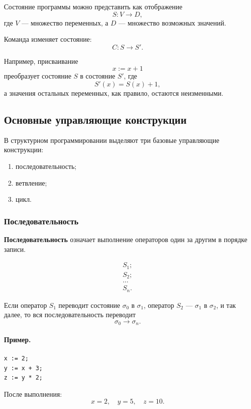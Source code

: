 \documentclass[12pt,a4paper]{article}
\begin{document}
Состояние программы можно представить как отображение
\[
    S : V \to D,
\]
где $V$ --- множество переменных, а $D$ --- множество возможных значений.

Команда изменяет состояние:
\[
    C : S \to S'.
\]

Например, присваивание
\[
    x := x + 1
\]
преобразует состояние $S$ в состояние $S'$, где
\[
    S'(x) = S(x) + 1,
\]
а значения остальных переменных, как правило, остаются неизменными.

\subsection{Основные управляющие конструкции}

В структурном программировании выделяют три базовые управляющие конструкции:
\begin{enumerate}
    \item последовательность;
    \item ветвление;
    \item цикл.
\end{enumerate}

\subsubsection{Последовательность}

\textbf{Последовательность} означает выполнение операторов один за другим в порядке записи.

\[
\begin{array}{l}
    S_1;\\
    S_2;\\
    \dots\\
    S_n.
\end{array}
\]

Если оператор $S_1$ переводит состояние $\sigma_0$ в $\sigma_1$, оператор $S_2$ --- $\sigma_1$ в $\sigma_2$, и так далее, то вся последовательность переводит
\[
    \sigma_0 \to \sigma_n.
\]

\paragraph{Пример.}

\begin{verbatim}
x := 2;
y := x + 3;
z := y * 2;
\end{verbatim}

После выполнения:
\[
    x = 2,\quad y = 5,\quad z = 10.
\]
\end{document}
